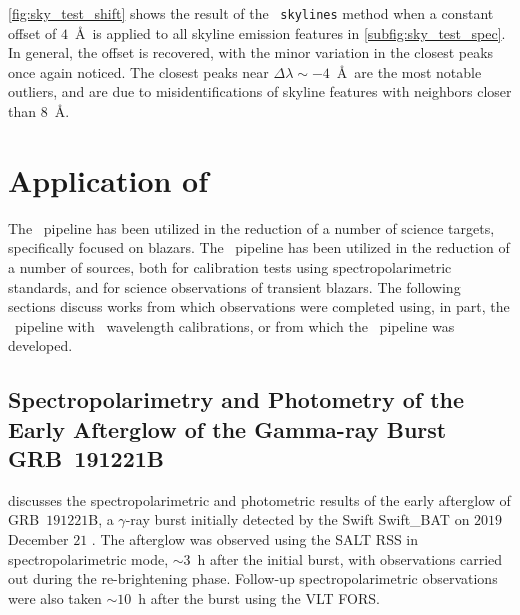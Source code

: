 \autoref{fig:sky_test_shift} shows the result of the \stops\ \texttt{skylines} method when a constant offset of $4$~\AA\ is applied to all skyline emission features in \autoref{subfig:sky_test_spec}.
In general, the offset is recovered, with the minor variation in the closest peaks once again noticed.
The closest peaks near $\Delta \lambda \sim -4$~\AA\ are the most notable outliers, and are due to misidentifications of skyline features with neighbors closer than $8$~\AA.

\section[Application of \textsc{stops}]{Application of \stops} \label{sec:app_stops}

The \stops\ pipeline has been utilized in the reduction of a number of science targets, specifically focused on blazars.
The \stops\ pipeline has been utilized in the reduction of a number of sources, both for calibration tests using spectropolarimetric standards, and for science observations of transient blazars.
The following sections discuss works from which observations were completed using, in part, the \stops\ pipeline with \iraf\ wavelength calibrations, or from which the \stops\ pipeline was developed.



\subsection[Spectropolarimetry and Photometry of the Early Afterglow of the Gamma-ray Burst GRB~191221B]{%
    Spectropolarimetry and Photometry of the Early Afterglow of the Gamma-ray Burst GRB~191221B\\
    \citep{Buckley191221B}
}

\citet{Buckley191221B} discusses the spectropolarimetric and photometric results of the early afterglow of GRB~$191221$B, a $\gamma$-ray burst initially detected by the \gls{Swift} \gls{Swift_BAT} \citep{swift_bat} on $2019$ December $21$ \citep{grb191221b}.
The afterglow was observed using the \gls{SALT} \gls{RSS} in spectropolarimetric mode, $\sim 3$~h after the initial burst, with observations carried out during the re-brightening phase.
Follow-up spectropolarimetric observations were also taken $\sim 10$~h after the burst using the \gls{VLT} \gls{FORS}.

